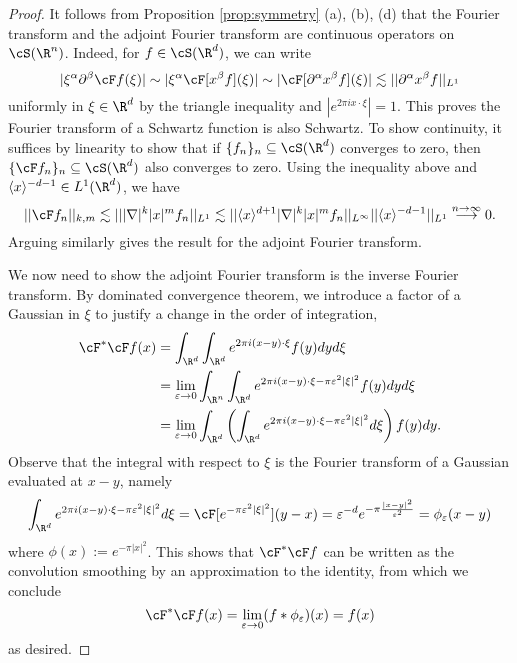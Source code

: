 \documentclass[reqno]{amsart}
\theoremstyle{definition}
\theoremstyle{remark}
\renewcommand{\epsilon}{\varepsilon}
\begin{document}
\begin{proof}
	It follows from Proposition \ref{prop:symmetry} (a), (b), (d) that the Fourier transform and the adjoint Fourier transform are continuous operators on $\cS (\R^n)$. Indeed, for $f \in \cS (\R^d)$, we can write
		\[ |\xi^\alpha \partial^\beta \cF f (\xi)| \sim |\xi^\alpha \cF [x^\beta f] (\xi)| \sim |\cF[\partial^\alpha x^\beta f] (\xi)| \lesssim || \partial^\alpha x^\beta f ||_{L^1} \]
	uniformly in $\xi \in \R^d$ by the triangle inequality and $|e^{2\pi i x \cdot \xi}| = 1$. This proves the Fourier transform of a Schwartz function is also Schwartz. To show continuity, it suffices by linearity to show that if $\{ f_n \}_n \subseteq \cS( \R^d)$ converges to zero, then $\{\cF f_n\}_n \subseteq \cS (\R^d)$ also converges to zero. Using the inequality above and $\langle x\rangle^{-d-1} \in L^1 (\R^d)$, we have
		\[ ||\cF f_n||_{k, m} \lesssim || |\nabla|^k |x|^m f_n||_{L^1} \lesssim || \langle x \rangle^{d + 1} |\nabla|^k |x|^m f_n||_{L^\infty} || \langle x \rangle^{-d - 1} ||_{L^1} \overset{n \to \infty}{\longrightarrow} 0.\]
	Arguing similarly gives the result for the adjoint Fourier transform. 
	
	We now need to show the adjoint Fourier transform is the inverse Fourier transform. By dominated convergence theorem, we introduce a factor of a Gaussian in $\xi$ to justify a change in the order of integration,
		\begin{align*}
			\cF^* \cF f (x)
				&= 
					\int_{\R^d} \int_{\R^d} e^{2\pi i (x - y)\cdot \xi} f(y) dy d\xi\\
				&= \lim_{\epsilon \to 0} 
					\int_{\R^n}  \int_{\R^d} e^{2\pi i (x - y) \cdot \xi - \pi \epsilon^2 |\xi|^2} f(y) dy d\xi \\
					&= \lim_{\epsilon \to 0} 
				\int_{\R^d}  \left(\int_{\R^d} e^{2\pi i (x - y) \cdot \xi - \pi \epsilon^2 |\xi|^2} d\xi\right) f(y) dy.
		\end{align*}	
	Observe that the integral with respect to $\xi$ is the Fourier transform of a Gaussian evaluated at $x - y$, namely
		\[ \int_{\R^d} e^{2\pi i (x - y) \cdot \xi - \pi \epsilon^2 |\xi|^2} d\xi = \cF[e^{-\pi \epsilon^2 |\xi|^2}] (y - x) = \epsilon^{-d} e^{-\pi \frac{|x - y|^2}{\epsilon^2}} = \phi_\epsilon (x - y) \]
	where $\phi (x) := e^{-\pi |x|^2}$. This shows that $\cF^* \cF f$ can be written as the convolution smoothing by an approximation to the identity, from which we conclude
		\[ \cF^* \cF f (x) = \lim_{\epsilon \to 0} (f * \phi_\epsilon) (x) = f(x) \]
	as desired. 
\end{proof}
\end{document}
